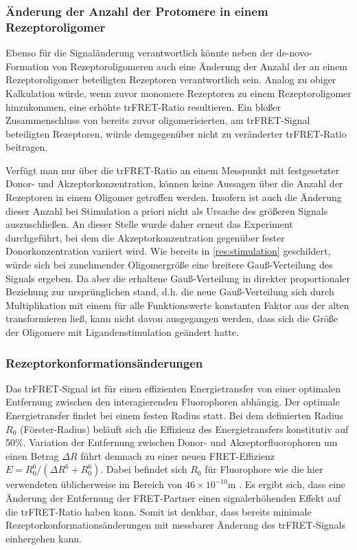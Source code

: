 \subsubsection{Änderung der Anzahl der Protomere in einem Rezeptoroligomer}
Ebenso für die Signaländerung verantwortlich könnte neben der de-novo-Formation von Rezeptoroligomeren auch eine Änderung der Anzahl der an einem Rezeptoroligomer beteiligten Rezeptoren verantwortlich sein. Analog zu obiger Kalkulation würde, wenn zuvor monomere Rezeptoren zu einem Rezeptoroligomer hinzukommen, eine erhöhte trFRET-Ratio resultieren. Ein bloßer Zusammenschluss von bereits zuvor oligomerisierten, am trFRET-Signal beteiligten Rezeptoren, würde demgegenüber nicht zu veränderter trFRET-Ratio beitragen.

Verfügt man nur über die trFRET-Ratio an einem Messpunkt mit festgesetzter Donor- und Akzeptorkonzentration, können keine Aussagen über die Anzahl der Rezeptoren in einem Oligomer getroffen werden. Insofern ist auch die Änderung dieser Anzahl bei Stimulation a priori nicht als Ursache des größeren Signals auszuschließen. An dieser Stelle wurde daher erneut das Experiment durchgeführt, bei dem die Akzeptorkonzentration gegenüber fester Donorkonzentration variiert wird. Wie bereits in \ref{res:stimulation} geschildert, würde sich bei zunehmender Oligomergröße eine breitere Gauß-Verteilung des Signals ergeben. Da aber die erhaltene Gauß-Verteilung in direkter proportionaler Beziehung zur ursprünglichen stand, d.h. die neue Gauß-Verteilung sich durch Multiplikation mit einem für alle Funktionswerte konstanten Faktor aus der alten transformieren ließ, kann nicht davon ausgegangen werden, dass sich die Größe der Oligomere mit Ligandenstimulation geändert hatte.

\subsubsection{Rezeptorkonformationsänderungen}
Das trFRET-Signal ist für einen effizienten Energietransfer von einer optimalen Entfernung zwischen den interagierenden Fluorophoren abhängig. Der optimale Energietransfer findet bei einem festen Radius statt. Bei dem definierten Radius $R_0$ (Förster-Radius) beläuft sich die Effizienz des Energietransfers konstitutiv auf 50\%. Variation der Entfernung zwischen Donor- und Akzeptorfluorophoren um einen Betrag $\Delta R$ führt demnach zu einer neuen FRET-Effizienz $E=R_0^6/(\Delta R^6+R_0^6)$. Dabei befindet sich $R_0$ für Fluorophore wie die hier verwendeten üblicherweise im Bereich von $46 \times 10^{-10}$\si{\meter} \parencite{Doumazane2011, Maurel2008}. Es ergibt sich, dass eine Änderung der Entfernung der FRET-Partner einen signalerhöhenden Effekt auf die trFRET-Ratio haben kann. Somit ist denkbar, dass bereits minimale Rezeptorkonformationsänderungen mit messbarer Änderung des trFRET-Signals einhergehen kann.


